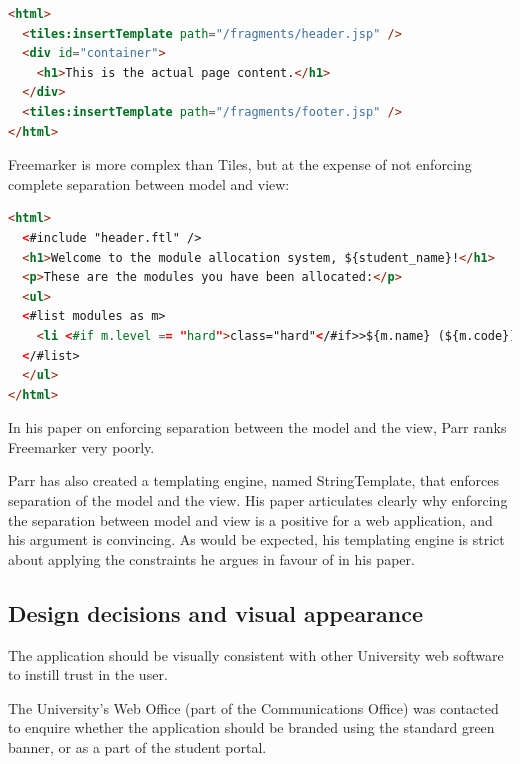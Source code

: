 \documentclass[draft]{scrartcl}
\begin{document}
\begin{lstlisting}[language=HTML]
<html>
  <tiles:insertTemplate path="/fragments/header.jsp" />
  <div id="container">
    <h1>This is the actual page content.</h1>
  </div>
  <tiles:insertTemplate path="/fragments/footer.jsp" />
</html>
\end{lstlisting}


Freemarker is more complex than Tiles, but at the expense of not enforcing
complete separation between model and view:

\begin{lstlisting}[language=HTML]
<html>
  <#include "header.ftl" />
  <h1>Welcome to the module allocation system, ${student_name}!</h1>
  <p>These are the modules you have been allocated:</p>
  <ul>
  <#list modules as m>
    <li <#if m.level == "hard">class="hard"</#if>>${m.name} (${m.code})</li>
  </#list>
  </ul>
</html>
\end{lstlisting}

In his paper on enforcing separation between the model and the view, Parr
\cite{Parr2004templateengines} ranks Freemarker very poorly.


Parr has also created a templating engine, named StringTemplate, that enforces
separation of the model and the view. His paper articulates clearly why
enforcing the separation between model and view is a positive for a web
application, and his argument is convincing. As would be expected, his
templating engine is strict about applying the constraints he argues in favour
of in his paper.



\subsection{Design decisions and visual appearance}

The application should be visually consistent with other University web
software to instill trust in the user.

The University's Web Office (part of the Communications Office) was contacted
to enquire whether the application should be branded using the standard green
banner, or as a part of the student portal.
\end{document}
